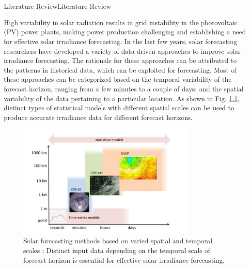 \chapter{}{Literature Review}{Literature Review}
\par High variability in solar radiation results in grid instability in the photovoltaic (PV) power plants, making power production challenging and establishing a need for effective solar irradiance forecasting. In the last few years, solar forecasting researchers have developed a variety of data-driven approaches to improve solar irradiance forecasting. The rationale for these approaches can be attributed to the patterns in historical data, which can be exploited for forecasting. Most of these approaches can be categorized based on the temporal variability of the forecast horizon, ranging from a few minutes to a couple of days; and the spatial variability of the data pertaining to a particular location. As shown in Fig. \ref{fig:fig_variability}, distinct types of statistical models with different spatial scales can be used to produce accurate irradiance data for different forecast horizons.

\begin{figure}[ht]
    \begin{center}
    	\includegraphics[width=0.8\textwidth]{chapter2/fig_variability.png}
    	\caption[Solar forecasting methods based on varied spatial and temporal scales]{Solar forecasting methods based on varied spatial and temporal scales \cite{multimodel_figure1}: Distinct input data depending on the temporal scale of forecast horizon is essential for effective solar irradiance forecasting.}
    	\label{fig:fig_variability}
    \end{center}
\end{figure}

\restoregeometry

